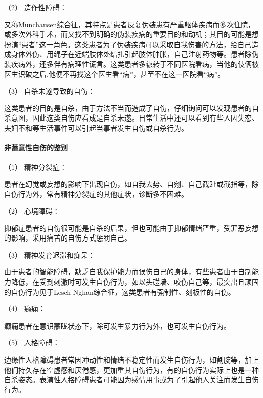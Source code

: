 \hypertarget{text00053.htmlux5cux23CHP1-18-11-2-1-2}{}
（2） 造作性障碍：

又称Munchausen综合征，其特点是患者反复伪装患有严重躯体疾病而多次住院，或多次外科手术，而又找不到明确的伪装疾病的重要目的和动机；其目的可能是想扮演“患者”这一角色。这类患者为了伪装疾病可以采取自我伤害的方法，给自己造成身体外伤、用绳子在近端肢体处结扎引起肢体肿胀，自己注射药物等。患者除伪装疾病外，还多伴有病理性谎言。这类患者多辗转于不同医院看病，当他的伎俩被医生识破之后.他便不再找这个医生看“病”，甚至不在这一医院看“病”。

\hypertarget{text00053.htmlux5cux23CHP1-18-11-2-1-3}{}
（3） 自杀未遂导致的自伤：

这类患者的目的是自杀，由于方法不当而造成了自伤，仔细询问可以发现患者的自杀意图，因此这类自伤应看成是自杀未遂。日常生活中还可以看到有些人因失恋、夫妇不和等生活事件可以引起当事者发生自伤或自杀行为。

\paragraph{非蓄意性自伤的鉴别}

\hypertarget{text00053.htmlux5cux23CHP1-18-11-2-2-1}{}
（1） 精神分裂症：

患者在幻觉或妄想的影响下出现自伤，如自我去势、自剜、自己截趾或截指等，除自伤行为外，常有精神分裂症的其他症状，诊断多不困难。

\hypertarget{text00053.htmlux5cux23CHP1-18-11-2-2-2}{}
（2） 心境障碍：

抑郁症患者的自伤很可能是自杀的后果，但也可能由于抑郁情绪严重，受罪恶妄想的影响，采用痛苦的自伤方式惩罚自己。

\hypertarget{text00053.htmlux5cux23CHP1-18-11-2-2-3}{}
（3） 精神发育迟滞和痴呆：

由于患者的智能障碍，缺乏自我保护能力而误伤自己的身体，有些患者由于自制能力降低，在受到刺激时可发生自伤行为，如以头碰墙、咬伤自己等，最突出且顽固的自伤行为见于Lesch-Nghan综合征，这类患者有强制性、刻板性的自伤。

\hypertarget{text00053.htmlux5cux23CHP1-18-11-2-2-4}{}
（4） 癫痫：

癫痫患者在意识蒙眬状态下，除可发生暴力行为外，也可发生自伤行为。

\hypertarget{text00053.htmlux5cux23CHP1-18-11-2-2-5}{}
（5） 人格障碍：

边缘性人格障碍患者常因冲动性和情绪不稳定性而发生自伤行为，如割腕等，加上他们持久存在空虚感和厌倦感，更加重其自伤行为，有的自伤行为实际上也是一种自杀姿态。表演性人格障碍患者可能因为感情用事或为了引起他人关注而发生自伤行为。

